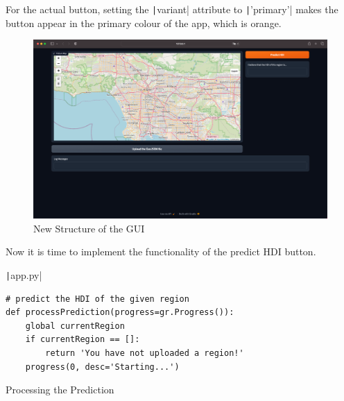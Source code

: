 \documentclass[12pt]{report}
\newcommand{\pil}[1]{\protect\texttt|#1|}
\begin{document}
For the actual button, setting the \pil{variant} attribute to \pil{'primary'} makes the button appear in the primary colour of the app, which is orange.

\begin{figure}[H]
\centering
\includegraphics[width=14cm]{ss12.3.png}
\caption{New Structure of the GUI}\label{fig:ss12.3}
\end{figure}

\begin{center}
\end{center}

Now it is time to implement the functionality of the predict HDI button.

\begin{listing}[H]
\pil{app.py}
\begin{verbatim}
# predict the HDI of the given region
def processPrediction(progress=gr.Progress()):
    global currentRegion
    if currentRegion == []:
        return 'You have not uploaded a region!'
    progress(0, desc='Starting...')
\end{verbatim}
\caption{Processing the Prediction}\label{cs:processPrediction}
\end{listing}
\end{document}

